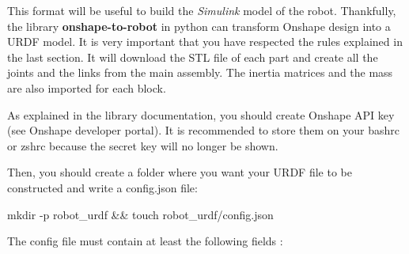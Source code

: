 \bigbreak
This format will be useful to build the \textit{Simulink} model of the robot. Thankfully, the library \textbf{onshape-to-robot} in python can transform Onshape design into a URDF model. It is very important that you have respected the rules explained in the last section. It will download the STL file of each part and create all the joints and the links from the main assembly. The inertia matrices and the mass are also imported for each block. 

\bigbreak
As explained in the library documentation, you should create Onshape API key (see Onshape developer portal). It is recommended to store them on your bashrc or zshrc because the secret key will no longer be shown.

\bigbreak
\begin{center}
    \begin{minipage}{10cm}
    \end{minipage}
\end{center}

\bigbreak
Then, you should create a folder where you want your URDF file to be constructed and write a config.json file:
\begin{commandshell}
    mkdir -p robot\_urdf && touch robot\_urdf/config.json
\end{commandshell} 

\bigbreak
The config file must contain at least the following fields :
\begin{center}
    \begin{minipage}{8cm}
    \end{minipage}
\end{center}

